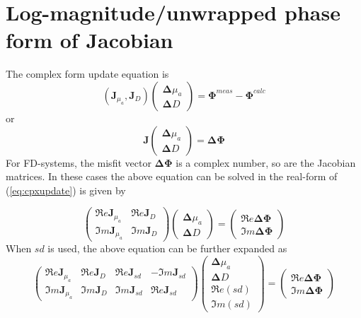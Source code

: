 \documentclass[12pt]{book}               %
\begin{document}
\section{Log-magnitude/unwrapped phase form of Jacobian}
The complex form update equation is
\begin{equation}
\left(\mathbf{J}_{\mu_a},\mathbf{J}_{D}\right)\left(
\begin{array}{l}
\boldsymbol{\Delta}{\mu_a}\\
\boldsymbol{\Delta}{D}
\end{array}
\right)=\boldsymbol{\Phi}^{meas}-\boldsymbol{\Phi}^{calc}
\end{equation}
or
\begin{equation}
\label{eq:cpxupdate} \mathbf{J}\left(
\begin{array}{l}
\boldsymbol{\Delta}{\mu_a}\\
\boldsymbol{\Delta}{D}
\end{array}
\right)=\boldsymbol{\Delta}\boldsymbol{\Phi}
\end{equation}
For FD-systems, the misfit vector $\mathbf{\Delta\Phi}$ is a complex number, so are the Jacobian matrices. In these cases the above equation can be solved in the real-form of (\ref{eq:cpxupdate}) is given by

\begin{equation}\label{eq:singlewavelength}
\left(
\begin{array}{ll}
\Re e{\mathbf{J}}_{\mu_a} & \Re e{\mathbf{J}}_{D}\\
\Im m{\mathbf{J}}_{\mu_a} & \Im m{\mathbf{J}}_{D}
\end{array}\right)
\left(
\begin{array}{l}
\boldsymbol{\Delta}{\mu_a}\\
\boldsymbol{\Delta}{D}
\end{array}
\right)=\left(
\begin{array}{l}
\Re e{\boldsymbol{\Delta\Phi}}\\
\Im m{\boldsymbol{\Delta\Phi}}
\end{array}\right)
\end{equation}
When $sd$ is used, the above equation can be further expanded as
\begin{equation}
\label{eq:realupdate}\left(
\begin{array}{lllr}
\Re e{\mathbf{J}}_{\mu_a} & \Re e{\mathbf{J}}_{D} & \Re e{\mathbf{J}}_{sd} & -\Im m{\mathbf{J}}_{sd}\\
\Im m{\mathbf{J}}_{\mu_a} & \Im m{\mathbf{J}}_{D} & \Im m{\mathbf{J}}_{sd} & \Re e{\mathbf{J}}_{sd}
\end{array}\right)
\left(
\begin{array}{l}
\boldsymbol{\Delta}{\mu_a}\\
\boldsymbol{\Delta}{D}\\
\Re e({sd})\\
\Im m({sd})
\end{array}
\right)=\left(
\begin{array}{l}
\Re e{\boldsymbol{\Delta\Phi}}\\
\Im m{\boldsymbol{\Delta\Phi}}
\end{array}\right)
\end{equation}
\end{document}
